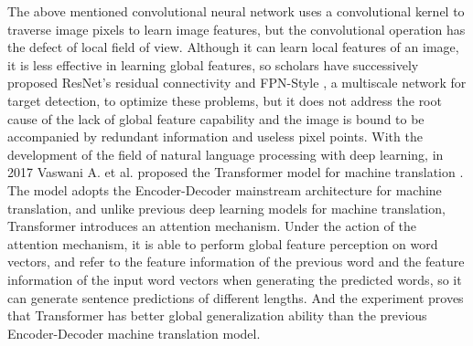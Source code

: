 \documentclass{article}
\begin{document}
The above mentioned convolutional neural network uses a convolutional kernel to traverse image pixels to learn image features, but the convolutional operation has the defect of local field of view. Although it can learn local features of an image, it is less effective in learning global features, so scholars have successively proposed ResNet's residual connectivity and FPN-Style \cite{12}, a multiscale network for target detection, to optimize these problems, but it does not address the root cause of the lack of global feature capability and the image is bound to be accompanied by redundant information and useless pixel points. With the development of the field of natural language processing with deep learning, in 2017 Vaswani A. et al. proposed the Transformer model for machine translation \cite{13}. The model adopts the Encoder-Decoder mainstream architecture for machine translation, and unlike previous deep learning models for machine translation, Transformer introduces an attention mechanism. Under the action of the attention mechanism, it is able to perform global feature perception on word vectors, and refer to the feature information of the previous word and the feature information of the input word vectors when generating the predicted words, so it can generate sentence predictions of different lengths. And the experiment proves that Transformer has better global generalization ability than the previous Encoder-Decoder machine translation model.
\end{document}
